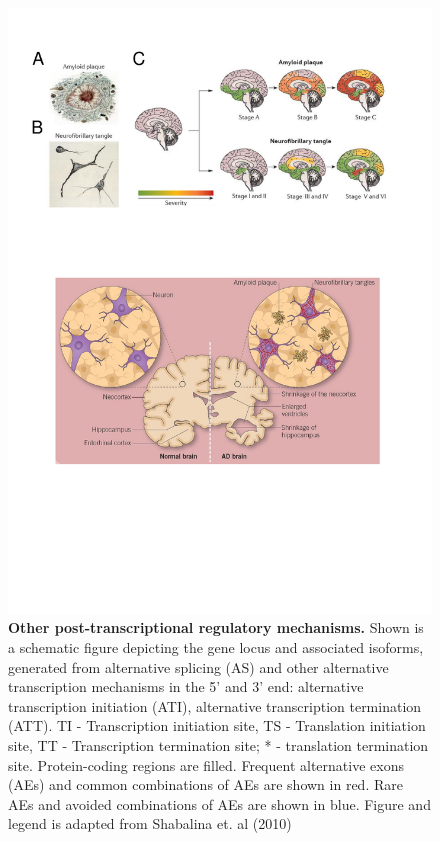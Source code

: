 \vspace{1cm}
\begin{figure}[!ht]
	\centering
	\includegraphics[page=14,trim={0 15cm 2cm 2cm},clip, scale = 0.7]{Figures/Introduction_Figures.pdf}
	\captionsetup{width=0.95\textwidth,singlelinecheck=off}
	\caption[Other post-transcriptional regulatory mechanisms]%
	{\textbf{Other post-transcriptional regulatory mechanisms.} Shown is a schematic figure depicting the gene locus and associated isoforms, generated from alternative splicing (AS) and other alternative transcription mechanisms in the 5' and 3' end: alternative transcription initiation (ATI), alternative transcription termination (ATT). \newline
	TI - Transcription initiation site, TS - Translation initiation site, TT - Transcription termination site; * - translation termination site. Protein-coding regions are filled. Frequent alternative exons (AEs) and common combinations of AEs are shown in red. Rare AEs and avoided combinations of AEs are shown in blue. Figure and legend is adapted from Shabalina et. al (2010)\cite{Shabalina2010}
	}
	\label{fig:AS_others}
\end{figure}

